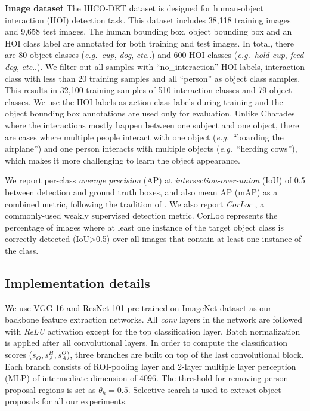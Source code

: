 \documentclass[10pt,twocolumn,letterpaper]{article}
\makeatletter
\DeclareRobustCommand\onedot{\futurelet\@let@token\@onedot}
\def\onedot{\ifx\@let@token.\else.\null\fi\xspace}
\def\eg{\emph{e.g.}}
\def\etc{\emph{etc}\onedot}
\makeatother
\begin{document}
\textbf{Image dataset} The HICO-DET dataset \cite{chao2018learning} is designed for human-object interaction (HOI) detection task. This dataset includes 38,118 training images and 9,658 test images. The human bounding box, object bounding box and an HOI class label are annotated for both training and test images. In total, there are 80 object classes (\eg~\textit{cup}, \textit{dog}, \etc) and 600 HOI classes (\eg~\textit{hold cup}, \textit{feed dog}, \etc).  We filter out all samples with ``no\_interaction'' HOI labels, interaction class with less than 20 training samples and all ``person'' as object class samples. This results in 32,100 training samples of 510 interaction classes and 79 object classes. We use the HOI labels as action class labels during training and the object bounding box annotations are used only for evaluation. Unlike Charades where the interactions mostly happen between one subject and one object, there are cases where multiple people interact with one object (\eg~``boarding the airplane'') and one person interacts with multiple objects (\eg~``herding cows''), which makes it more challenging to learn the object appearance.

We report per-class \textit{average precision} (AP) at \textit{intersection-over-union} (IoU) of 0.5 between detection and ground truth boxes, and also mean AP (mAP) as a combined metric, following the tradition of \cite{yuan2017temporal}. We also report \textit{CorLoc} \cite{deselaers2012weakly}, a commonly-used weakly supervised detection metric. CorLoc represents the percentage of images where at least one instance of the target object class is correctly detected (IoU\textgreater0.5) over all images that contain at least one instance of the class.

\vspace{-0.4\baselineskip}
\subsection{Implementation details}
\vspace{-0.4\baselineskip}
We use VGG-16 and ResNet-101 pre-trained on ImageNet dataset as our backbone feature extraction networks. All \textit{conv} layers in the network are followed with \textit{ReLU} activation except for the top classification layer. Batch normalization \cite{ioffe2015batch} is applied after all convolutional layers. In order to compute the classification scores ($s_O, s_A^H, s_A^O$), three branches are built on top of the last convolutional block. Each branch consists of ROI-pooling layer and 2-layer multiple layer perception (MLP) of intermediate dimension of 4096. The threshold for removing person proposal regions is set as $\theta_h=0.5$. Selective search \cite{uijlings2013selective} is used to extract object proposals for all our experiments.
\end{document}
